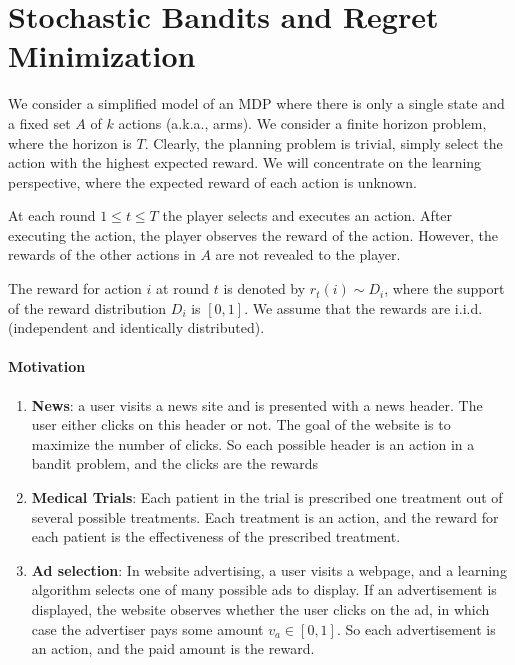 

\section{Stochastic Bandits and Regret Minimization}

We consider a simplified model of an MDP where there is only a
single state and a fixed set $A$ of $k$ actions (a.k.a., arms). We
consider a finite horizon problem, where the horizon is $T$.
Clearly, the planning problem is trivial, simply select the action
with the highest expected reward. We will concentrate on the
learning perspective, where the expected reward of each action is
unknown.

At each round $1\leq t\leq T$ the player selects and executes an
action. After executing the action, the player observes the reward
of the action. However, the rewards of the other actions in $A$ are
not revealed to the player.

The reward for action $i$ at round $t$ is denoted by $r_{t}(i)\sim
D_{i}$, where the support of the reward distribution $D_{i}$ is
$[0,1]$. We assume that the rewards are i.i.d. (independent and
identically distributed).

\paragraph{Motivation}
\begin{enumerate}
\item \textbf{News}: a user visits a news site and is presented with a news
header. The user either clicks on this header or not. The goal of
the website is to maximize the number of clicks. So each possible
header is an action in a bandit problem, and the clicks are the
rewards
\item \textbf{Medical Trials}: Each patient in the trial is prescribed one
treatment out of several possible treatments. Each treatment is an
action, and the reward for each patient is the effectiveness of the
prescribed treatment.
\item \textbf{Ad selection}: In website advertising, a user visits a webpage,
and a learning algorithm selects one of many possible ads to
display. If an advertisement is displayed, the website observes
whether the user clicks on the ad, in which case the advertiser pays
some amount $v_{a} \in[0, 1]$. So each advertisement is an action,
and the paid amount is the reward.
\end{enumerate}

